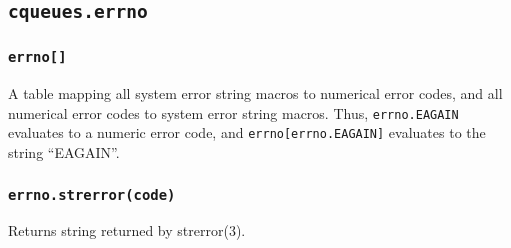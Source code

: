 \documentclass[11pt, oneside]{memoir}
\newcommand{\fn}[1]{\texttt{#1} }
\newcounter{toccols}
\newenvironment{Module}[1]{
	\subsection{\texttt{#1}}
	\addtocontents{toc}{
		\protect\begin{multicols}{\value{toccols}}
	}
}{
	\addtocontents{toc}{\protect\end{multicols}}
}
\begin{document}
\begin{Module}{cqueues.errno}

\subsubsection[\fn{errno[]}]{\fn{errno[]}}
A table mapping all system error string macros to numerical error codes, and all numerical error codes to system error string macros. Thus, \texttt{errno.EAGAIN} evaluates to a numeric error code, and \texttt{errno[errno.EAGAIN]} evaluates to the string ``EAGAIN''.

\subsubsection[\fn{errno.strerror}]{\fn{errno.strerror(code)}}
Returns string returned by strerror(3).

\end{Module}
\end{document}
